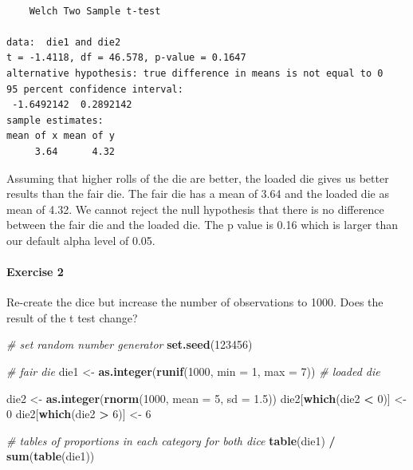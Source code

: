 \documentclass[]{article}
\newenvironment{Shaded}{\begin{snugshade}}{\end{snugshade}}
\newcommand{\KeywordTok}[1]{\textcolor[rgb]{0.13,0.29,0.53}{\textbf{#1}}}
\newcommand{\DataTypeTok}[1]{\textcolor[rgb]{0.13,0.29,0.53}{#1}}
\newcommand{\DecValTok}[1]{\textcolor[rgb]{0.00,0.00,0.81}{#1}}
\newcommand{\FloatTok}[1]{\textcolor[rgb]{0.00,0.00,0.81}{#1}}
\newcommand{\StringTok}[1]{\textcolor[rgb]{0.31,0.60,0.02}{#1}}
\newcommand{\CommentTok}[1]{\textcolor[rgb]{0.56,0.35,0.01}{\textit{#1}}}
\newcommand{\OperatorTok}[1]{\textcolor[rgb]{0.81,0.36,0.00}{\textbf{#1}}}
\newcommand{\NormalTok}[1]{#1}
\let\oldparagraph\paragraph
\renewcommand{\paragraph}[1]{\oldparagraph{#1}\mbox{}}
\theoremstyle{definition}
\theoremstyle{definition}
\theoremstyle{definition}
\theoremstyle{remark}
\begin{document}
\begin{verbatim}

    Welch Two Sample t-test

data:  die1 and die2
t = -1.4118, df = 46.578, p-value = 0.1647
alternative hypothesis: true difference in means is not equal to 0
95 percent confidence interval:
 -1.6492142  0.2892142
sample estimates:
mean of x mean of y 
     3.64      4.32 
\end{verbatim}

Assuming that higher rolls of the die are better, the loaded die gives
us better results than the fair die. The fair die has a mean of 3.64 and
the loaded die as mean of 4.32. We cannot reject the null hypothesis
that there is no difference between the fair die and the loaded die. The
p value is 0.16 which is larger than our default alpha level of 0.05.

\paragraph{Exercise 2}\label{exercise-2-3}

Re-create the dice but increase the number of observations to 1000. Does
the result of the t test change?

\begin{Shaded}
\begin{Highlighting}[]
\CommentTok{# set random number generator}
\KeywordTok{set.seed}\NormalTok{(}\DecValTok{123456}\NormalTok{)}

\CommentTok{# fair die}
\NormalTok{die1 <-}\StringTok{ }\KeywordTok{as.integer}\NormalTok{(}\KeywordTok{runif}\NormalTok{(}\DecValTok{1000}\NormalTok{, }\DataTypeTok{min =} \DecValTok{1}\NormalTok{, }\DataTypeTok{max =} \DecValTok{7}\NormalTok{))}
\CommentTok{# loaded die}

\NormalTok{die2 <-}\StringTok{ }\KeywordTok{as.integer}\NormalTok{(}\KeywordTok{rnorm}\NormalTok{(}\DecValTok{1000}\NormalTok{, }\DataTypeTok{mean =} \DecValTok{5}\NormalTok{, }\DataTypeTok{sd =} \FloatTok{1.5}\NormalTok{))}
\NormalTok{die2[}\KeywordTok{which}\NormalTok{(die2 }\OperatorTok{<}\StringTok{ }\DecValTok{0}\NormalTok{)] <-}\StringTok{ }\DecValTok{0}
\NormalTok{die2[}\KeywordTok{which}\NormalTok{(die2 }\OperatorTok{>}\StringTok{ }\DecValTok{6}\NormalTok{)] <-}\StringTok{ }\DecValTok{6}

\CommentTok{# tables of proportions in each category for both dice}
\KeywordTok{table}\NormalTok{(die1) }\OperatorTok{/}\StringTok{ }\KeywordTok{sum}\NormalTok{(}\KeywordTok{table}\NormalTok{(die1))}
\end{Highlighting}
\end{Shaded}
\end{document}
